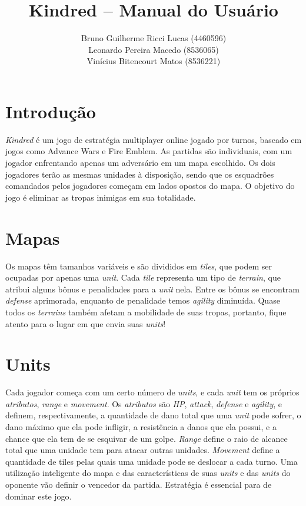 \documentclass{article}
\title{
    Kindred -- Manual do Usuário
}
\author{
    Bruno Guilherme Ricci Lucas (4460596)\\
    Leonardo Pereira Macedo (8536065)\\
    Vinícius Bitencourt Matos (8536221)
}
\begin{document}
\maketitle

\section{Introdução}

\emph{Kindred} é um jogo de estratégia multiplayer online jogado por turnos, baseado em jogos como Advance Wars e Fire Emblem. As partidas são individuais, com um jogador enfrentando apenas um adversário em um mapa escolhido. Os dois jogadores terão as mesmas unidades à disposição, sendo que os esquadrões comandados pelos jogadores começam em lados opostos do mapa. O objetivo do jogo é eliminar as tropas inimigas em sua totalidade. 

\section{Mapas}
Os mapas têm tamanhos variáveis e são divididos em \emph{tiles}, que podem ser ocupadas por apenas uma \emph{unit}. Cada \emph{tile} representa um tipo de \emph{terrain}, que atribui alguns bônus e penalidades para a \emph{unit} nela. Entre os bônus se encontram \emph{defense} aprimorada, enquanto de penalidade temos \emph{agility} diminuída. Quase todos os \emph{terrains} também afetam a mobilidade de suas tropas, portanto, fique atento para o lugar em que envia suas \emph{units}! 


\section{Units}
Cada jogador começa com um certo número de \emph{units}, e cada \emph{unit} tem os próprios \emph{atributos}, \emph{range} e \emph{movement}. Os \emph{atributos} são \emph{HP}, \emph{attack}, \emph{defense} e \emph{agility}, e definem, respectivamente, a quantidade de dano total que uma \emph{unit} pode sofrer, o dano máximo que ela pode infligir, a resistência a danos que ela possui, e a chance que ela tem de se esquivar de um golpe. \emph{Range} define o raio de alcance total que uma unidade tem para atacar outras unidades.  \emph{Movement} define a quantidade de tiles pelas quais uma unidade pode se deslocar a cada turno. Uma utilização inteligente do mapa e das características de suas \emph{units} e das \emph{units} do oponente vão definir o vencedor da partida. Estratégia é essencial para de dominar este jogo.
\end{document}
